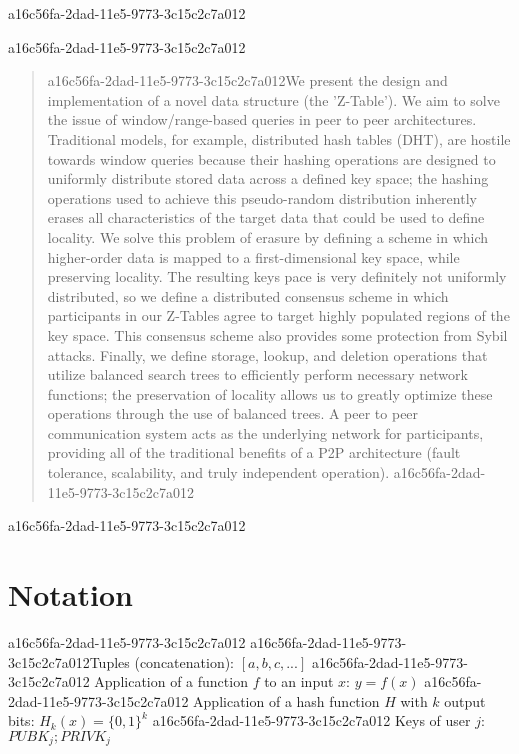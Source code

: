 \documentclass[12pt]{article}
\begin{document}
a16c56fa-2dad-11e5-9773-3c15c2c7a012
\maketitle

a16c56fa-2dad-11e5-9773-3c15c2c7a012\begin{abstract}
a16c56fa-2dad-11e5-9773-3c15c2c7a012We present the design and implementation of a novel data structure (the 'Z-Table'). We aim to solve the issue of window/range-based queries in peer to peer architectures. Traditional models, for example,  distributed hash tables (DHT), are hostile towards window queries because their hashing operations are designed to uniformly distribute stored data across a defined key space; the hashing operations used to achieve this pseudo-random distribution inherently erases all characteristics of the target data that could be used to define locality. We solve this problem of erasure by defining a scheme in which higher-order data is mapped to a first-dimensional key space, while preserving locality. The resulting keys pace is very definitely not uniformly distributed, so we define a distributed consensus scheme in which participants in our Z-Tables agree to target highly populated regions of the key space. This consensus scheme also provides some protection from Sybil attacks. Finally, we define storage, lookup, and deletion operations that utilize balanced search trees to efficiently perform necessary network functions; the preservation of locality allows us to greatly optimize these operations through the use of balanced trees. A peer to peer communication system acts as the underlying network for participants, providing all of the traditional benefits of a P2P architecture (fault tolerance, scalability, and truly independent operation).
a16c56fa-2dad-11e5-9773-3c15c2c7a012\end{abstract}

a16c56fa-2dad-11e5-9773-3c15c2c7a012\section{Notation}
a16c56fa-2dad-11e5-9773-3c15c2c7a012
a16c56fa-2dad-11e5-9773-3c15c2c7a012Tuples (concatenation): $[a,b,c,...]$
a16c56fa-2dad-11e5-9773-3c15c2c7a012
Application of a function $f$ to an input $x$: $y=f(x)$
a16c56fa-2dad-11e5-9773-3c15c2c7a012
Application of a hash function $H$ with $k$ output bits: $H_{k}(x) = \{0,1\}^k$
a16c56fa-2dad-11e5-9773-3c15c2c7a012
Keys of user $j$: $ PUBK_j; PRIVK_j $
\end{document}
